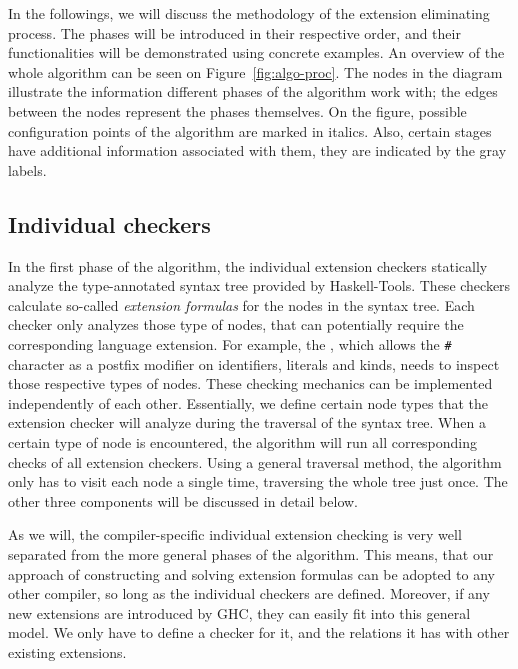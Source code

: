\documentclass[main.tex]{subfiles}
\begin{document}
	
	In the followings, we will discuss the methodology of the extension eliminating process. The phases will be introduced in their respective order, and their functionalities will be demonstrated using concrete examples. An overview of the whole algorithm can be seen on Figure~\ref{fig:algo-proc}. The nodes in the diagram illustrate the information different phases of the algorithm work with; the edges between the nodes represent the phases themselves. On the figure, possible configuration points of the algorithm are marked in italics. Also, certain stages have additional information associated with them, they are indicated by the gray labels.	
	
	\begin{figure}[t] 
		\centering
		
	\end{figure}
	
	\subsection{Individual checkers}
	
	In the first phase of the algorithm, the individual extension checkers statically analyze the type-annotated syntax tree provided by Haskell-Tools. These checkers calculate so-called \emph{extension formulas} for the nodes in the syntax tree. Each checker only analyzes those type of nodes, that can potentially require the corresponding language extension. For example, the , which allows the \texttt{\#} character as a postfix modifier on identifiers, literals and kinds, needs to inspect those respective types of nodes. These checking mechanics can be implemented independently of each other. Essentially, we define certain node types that the extension checker will analyze during the traversal of the syntax tree. When a certain type of node is encountered, the algorithm will run all corresponding checks of all extension checkers. Using a general traversal method, the algorithm only has to visit each node a single time, traversing the whole tree just once. The other three components will be discussed in detail below.
	
	As we will, the compiler-specific individual extension checking is very well separated from the more general phases of the algorithm. This means, that our approach of constructing and solving extension formulas can be adopted to any other compiler, so long as the individual checkers are defined. Moreover, if any new extensions are introduced by GHC, they can easily fit into this general model. We only have to define a checker for it, and the relations it has with other existing extensions.	
\end{document}
